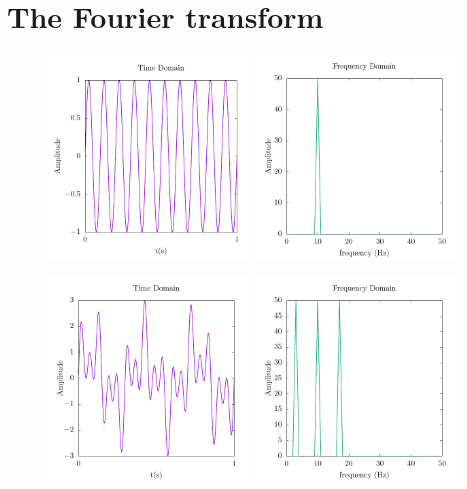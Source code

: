 \section{The Fourier transform}

\begin{figure}

\begin{centering}

\includegraphics[width = 0.48\textwidth]{data/splitop/fourier/sine_wave.pdf}
\includegraphics[width = 0.48\textwidth]{data/splitop/fourier/sine_fft.pdf}

\includegraphics[width = 0.48\textwidth]{data/splitop/fourier/3_waves.pdf}
\includegraphics[width = 0.48\textwidth]{data/splitop/fourier/3_fft.pdf}


\end{centering}
\end{figure}
